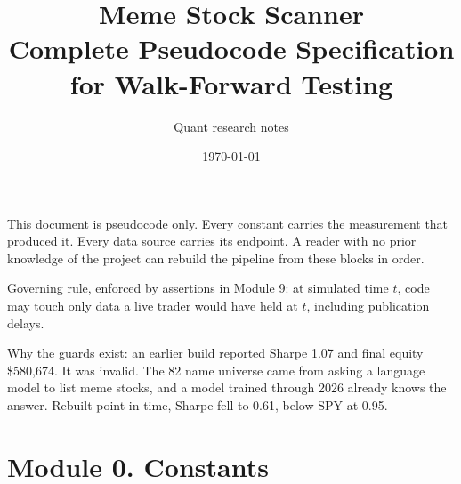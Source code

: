 \documentclass[10pt]{article}
\title{\textbf{Meme Stock Scanner}\\[2pt]\large Complete Pseudocode Specification
for Walk-Forward Testing}
\author{Quant research notes}
\date{\today}
\begin{document}
\maketitle

\noindent This document is pseudocode only. Every constant carries the measurement
that produced it. Every data source carries its endpoint. A reader with no prior
knowledge of the project can rebuild the pipeline from these blocks in order.

\vspace{4pt}
\noindent Governing rule, enforced by assertions in Module 9: at simulated time
$t$, code may touch only data a live trader would have held at $t$, including
publication delays.

\vspace{4pt}
\noindent Why the guards exist: an earlier build reported Sharpe 1.07 and final
equity \$580,674. It was invalid. The 82 name universe came from asking a language
model to list meme stocks, and a model trained through 2026 already knows the
answer. Rebuilt point-in-time, Sharpe fell to 0.61, below SPY at 0.95.

\section{Module 0. Constants}
\end{document}
